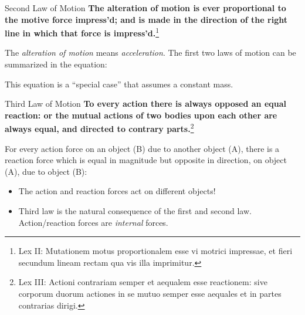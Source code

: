 \documentclass[12pt,compress,aspectratio=169]{beamer}
\newcommand{\mb}[1]{\ensuremath\mathbf{#1}}
\newcommand{\eq}[2]{\vspace{#1}{\Large\begin{displaymath}#2\end{displaymath}}}
\begin{document}
\begin{frame}{Second Law of Motion}
  \textbf{The alteration of motion is ever proportional to the motive force
    impress'd; and is made in the direction of the right line in which that
    force is impress'd.}\footnote{Lex II: Mutationem motus proportionalem esse
    vi motrici impressae, et fieri secundum lineam rectam qua vis illa
    imprimitur.}

  \vspace{.2in}The \emph{alteration of motion} means \emph{acceleration}. The
  first two laws of motion can be summarized in the equation:

  \eq{-.2in}{
    \boxed{\mb{F}_{\textrm{net}}=\Sigma\mb{F}=m\mb{a}}
  }

  \textcolor{red!80!black}{This equation is a ``special case'' that assumes a
    constant mass.}
\end{frame}


\begin{frame}{Third Law of Motion}
  \textbf{To every action there is always opposed an equal reaction: or the
    mutual actions of two bodies upon each other are always equal, and directed
    to contrary parts.}\footnote{Lex III: Actioni contrariam semper et aequalem
    esse reactionem: sive corporum duorum actiones in se mutuo semper esse
    aequales et in partes contrarias dirigi.}
 
  \vspace{.1in}For every action force on an object (B) due to another object
  (A), there is a reaction force which is equal in magnitude but opposite in
  direction, on object (A), due to object (B):

  \eq{-.3in}{
    \boxed{\mb{F}_{\textrm{A on B}} = -\mb{F}_{\textrm{B on A}}}
  }
  \begin{itemize}
  \item The action and reaction forces act on different objects!
  \item Third law is the natural consequence of the first and second law.
    Action/reaction forces are \emph{internal} forces.
  \end{itemize}
  \vspace{.2in}
\end{frame}
\end{document}
